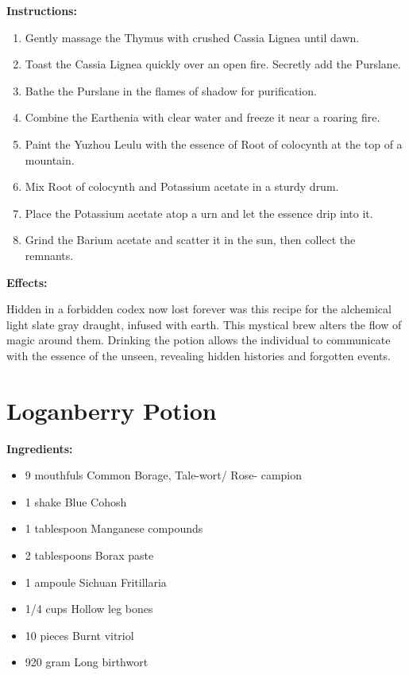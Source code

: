\documentclass{article}
\begin{document}
\textbf{Instructions:}

\begin{enumerate}
  \item Gently massage the Thymus with crushed Cassia Lignea until dawn.
  \item Toast the Cassia Lignea quickly over an open fire. Secretly add the Purslane.
  \item Bathe the Purslane in the flames of shadow for purification.
  \item Combine the Earthenia with clear water and freeze it near a roaring fire.
  \item Paint the Yuzhou Leulu with the essence of Root of colocynth at the top of a mountain.
  \item Mix Root of colocynth and Potassium acetate in a sturdy drum.
  \item Place the Potassium acetate atop a urn and let the essence drip into it.
  \item Grind the Barium acetate and scatter it in the sun, then collect the remnants.
\end{enumerate}

\textbf{Effects:}

Hidden in a forbidden codex now lost forever was this recipe for the alchemical light slate gray draught, infused with earth. This mystical brew alters the flow of magic around them. Drinking the potion allows the individual to communicate with the essence of the unseen, revealing hidden histories and forgotten events.

\newpage
\section*{Loganberry Potion}

\textbf{Ingredients:}

\begin{itemize}
  \item 9 mouthfuls Common Borage, Tale-wort/ Rose- campion
  \item 1 shake Blue Cohosh
  \item 1 tablespoon Manganese compounds
  \item 2 tablespoons Borax paste
  \item 1 ampoule Sichuan Fritillaria
  \item 1/4 cups Hollow leg bones
  \item 10 pieces Burnt vitriol
  \item 920 gram Long birthwort
\end{itemize}
\end{document}

